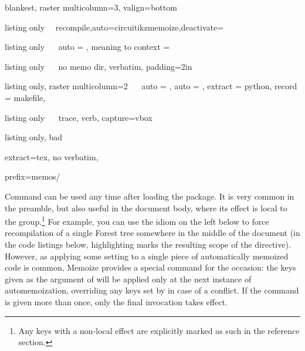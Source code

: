 \documentclass[a4paper,11pt]{article}
\begin{document}
\begin{tcbraster}[raster columns=4, raster valign=bottom]
  \begin{tcboxedraster}[raster columns=1]{blankest, raster multicolumn=3, valign=bottom}
    \begin{tcblisting}{listing only}
~\mmzset~{recompile,auto={circuitikz}{memoize},deactivate=\tikz}
    \end{tcblisting}
    \begin{tcblisting}{listing only}
~\mmzset~{ auto = , meaning to context = \foo }
    \end{tcblisting}
  \end{tcboxedraster}
  \begin{tcblisting}{listing only}
~\mmzset~{
  no memo dir,
  verbatim,
  padding=2in}
  \end{tcblisting}
\end{tcbraster}\par
\begin{tcbraster}[raster columns=4, raster valign=top]
  \begin{tcblisting}{listing only, raster multicolumn=2}
~\mmzset~{
  auto    = ,
  auto    = ,
  extract = python,
  record  = makefile,
}
  \end{tcblisting}
  \begin{tcblisting}{listing only}
~\mmzset~{
  trace,
  verb,
  capture=vbox
}
  \end{tcblisting}
  \begin{tcblisting}{listing only, bad}
~\mmzset~{
  extract=tex,
  no verbatim,

  prefix=memos/
}
  \end{tcblisting}
\end{tcbraster}

Command  can be used any time after loading the package.  It is
very common in the preamble, but also useful in the document body, where its
effect is local to the  group.\footnote{Any keys with a non-local
  effect are explicitly marked as such in the reference section.} For example,
you can use the idiom on the left below to force recompilation of a single
Forest tree somewhere in the middle of the document (in the code listings
below, highlighting marks the resulting scope of the 
directive).  However, as applying some setting to a single piece of
automatically memoized code is common, Memoize provides a special command for
the occasion: the keys given as the argument of  will be
applied only at the next instance of automemoization, overriding any keys set
by  in case of a conflict.  If the command is given more than
once, only the final invocation takes effect.
\end{document}
